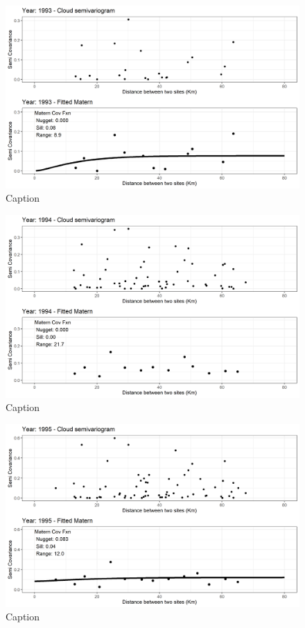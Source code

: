 \begin{figure}
    \centering
    \includegraphics{Figures/EmpiricalVariograms/Empirical_Variogram_1993.png}
    \caption{Caption}
    \label{fig:my_label}
\end{figure}

\begin{figure}
    \centering
    \includegraphics{Figures/EmpiricalVariograms/Empirical_Variogram_1994.png}
    \caption{Caption}
    \label{fig:my_label}
\end{figure}

\begin{figure}
    \centering
    \includegraphics{Figures/EmpiricalVariograms/Empirical_Variogram_1995.png}
    \caption{Caption}
    \label{fig:my_label}
\end{figure}

